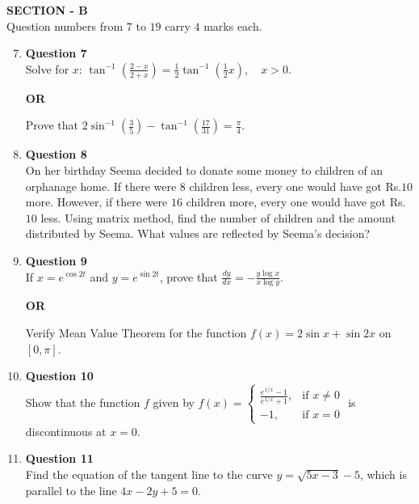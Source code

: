 \documentclass[12pt]{article}
\begin{document}
\begin{center}
\Large\textbf{SECTION - B}\\
\normalsize
Question numbers from $7$ to $19$ carry $4$ marks each.
\end{center}

\begin{enumerate}
\setcounter{enumi}{6}

\item \textbf{Question 7} \\
Solve for $x$:  
$
\tan^{-1} ( \frac{2 - x}{2 + x}) = \frac{1}{2} \tan^{-1}( \frac{1}{2}x), \quad x > 0.
$
\begin{center}
\textbf{OR} \\
\end{center}
Prove that  
$
2 \sin^{-1} ( \frac{3}{5} ) - \tan^{-1} ( \frac{17}{31}) = \frac{\pi}{4}.
$

\item \textbf{Question 8} \\
On her birthday Seema decided to donate some money to children of an orphanage home. If there were $8$ children less, every one would have got Rs.$10$ more. However, if there were $16$ children more, every one would have got Rs.$10$ less. Using matrix method, find the number of children and the amount distributed by Seema. What values are reflected by Seema’s decision?


\item \textbf{Question 9} \\
If $x = e^{\cos 2t}$ and $y = e^{\sin 2t}$, prove that  
$
\frac{dy}{dx} = -\frac{y \log x}{x \log y}.
$
\begin{center}
\textbf{OR} \\
\end{center}
Verify Mean Value Theorem for the function $f(x) = 2 \sin x + \sin 2x$ on $[0, \pi]$.

\item \textbf{Question 10} \\
Show that the function $f$ given by  
$
f(x) =
\begin{cases}
\frac{e^{1/x}-1}{e^{1/x} + 1}, & \text{if } x \ne 0 \\
-1, & \text{if } x = 0
\end{cases}
$  
is discontinuous at $x = 0$.

\item \textbf{Question 11} \\
Find the equation of the tangent line to the curve $y = \sqrt{5x - 3} - 5$, which is parallel to the line $4x - 2y + 5 = 0$.


\end{enumerate}
\end{document}
